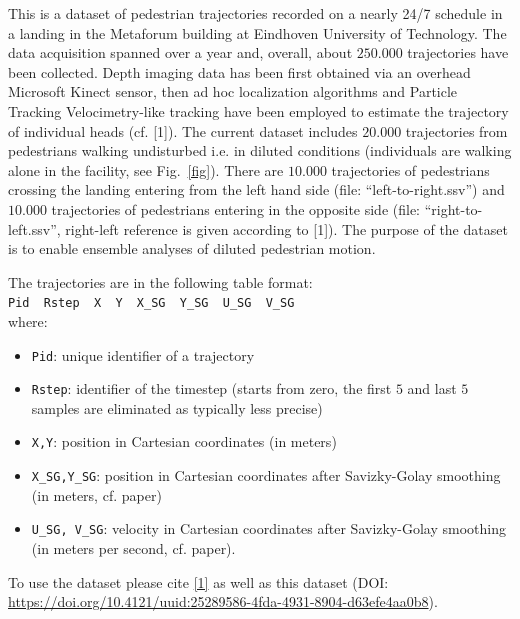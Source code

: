 \documentclass[12pt]{article}
\begin{document}
This is a dataset of pedestrian trajectories recorded on a nearly 24/7 schedule in a landing in the Metaforum building at Eindhoven University of Technology. The data acquisition spanned over a year and, overall, about $250.000$ trajectories have been collected. Depth imaging data has been first obtained via an overhead Microsoft Kinect sensor, then ad hoc localization algorithms and Particle Tracking Velocimetry-like tracking have been employed to estimate the trajectory of individual heads (cf. [1]). The current dataset includes $20.000$ trajectories from pedestrians walking undisturbed i.e. in diluted conditions (individuals are walking alone in the facility, see Fig.~\ref{fig}). There are $10.000$ trajectories of pedestrians crossing the landing entering from the left hand side (file: ``left-to-right.ssv'') and $10.000$ trajectories of pedestrians entering in the opposite side (file: ``right-to-left.ssv'', right-left reference is given according to [1]). The purpose of the dataset is to enable ensemble analyses of diluted pedestrian motion.

\noindent The trajectories are in the following table format: \\

\verb|Pid  Rstep  X  Y  X_SG  Y_SG  U_SG  V_SG| \\

\noindent where:
\begin{itemize}
  \item \verb|Pid|: unique identifier of a trajectory
  \item \verb|Rstep|: identifier of the timestep (starts from zero, the first $5$ and last $5$ samples are eliminated as typically less precise)
  \item \verb|X,Y|: position in Cartesian coordinates (in meters)
  \item \verb|X_SG,Y_SG|: position in Cartesian coordinates after Savizky-Golay smoothing (in meters, cf. paper) 
  \item \verb|U_SG, V_SG|: velocity in Cartesian coordinates after Savizky-Golay smoothing (in meters per second, cf. paper).
\end{itemize}

\noindent To use the dataset please cite \href{http://journals.aps.org/pre/abstract/10.1103/PhysRevE.95.032316}{[1]} as well as this dataset (DOI: \url{https://doi.org/10.4121/uuid:25289586-4fda-4931-8904-d63efe4aa0b8}).
\end{document}
